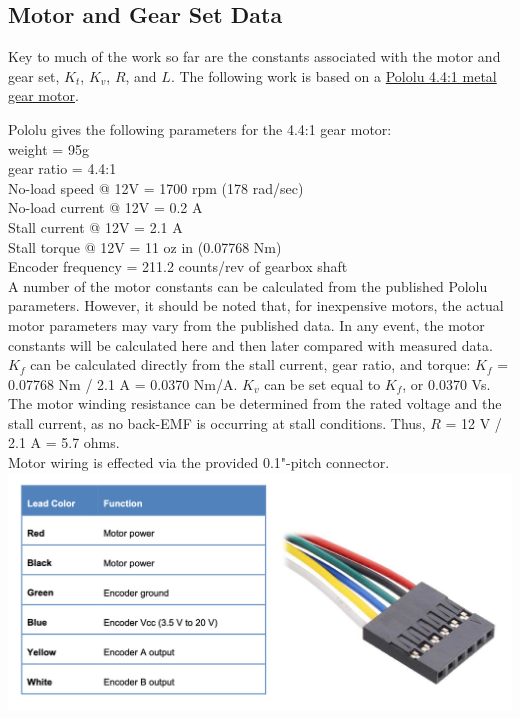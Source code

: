 \documentclass[12pt,letterpaper]{article}
\begin{document}
\begin{appendices}

\section{Motor and Gear Set Data}

Key to much of the work so far are the constants associated with the motor and gear set, $K_{t}$, $K_{v}$, $R$, and $L$.
The following work is based on a \href{https://www.pololu.com/product/3237}{Pololu  4.4:1 metal gear motor}.  

Pololu gives the following parameters for the 4.4:1 gear motor: \\
weight = 95g \\
gear ratio = 4.4:1 \\
No-load speed @ 12V = 1700 rpm (178 rad/sec)\\
No-load current @ 12V = 0.2 A \\
Stall current @ 12V = 2.1 A \\
Stall torque @ 12V = 11 oz in (0.07768 Nm)\\
Encoder frequency = 211.2 counts/rev of gearbox shaft\\

A number of the motor constants can be calculated from the published Pololu parameters.  However, it
should  be noted that, for inexpensive motors, the actual motor parameters may vary from the 
published data.  In any event, the motor constants will be calculated here and then later compared
with measured data.\\

$K_{f}$ can be calculated directly from the stall current, gear ratio, and torque: $K_{f}$ = 0.07768 Nm /  2.1 A = 
0.0370 Nm/A.  $K_{v}$ can be set equal to $K_{f}$, or 0.0370 Vs.\\

The motor winding resistance can be determined from the rated voltage and the stall current, as no back-EMF is occurring at stall
conditions.  Thus, $R$ = 12 V / 2.1 A = 5.7 ohms.\\

Motor wiring is effected via the provided 0.1"-pitch connector.
\includegraphics[width=\textwidth]{images/connector.png} 




\end{appendices}
\end{document}
